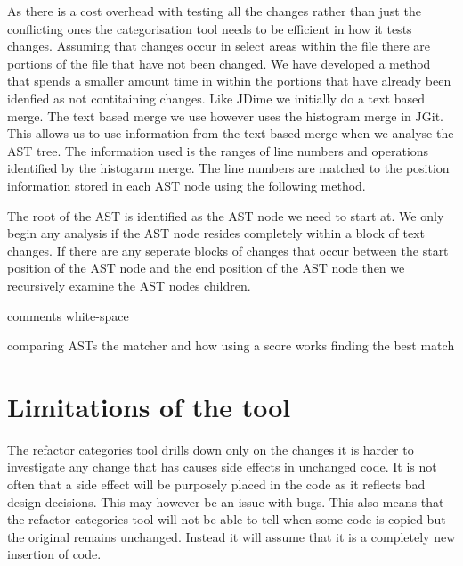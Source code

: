 As there is a cost overhead with testing all the changes rather than just the conflicting ones the categorisation tool needs to be efficient in how it tests changes.  Assuming that changes occur in select areas within the file there are portions of the file that have not been changed.  We have developed a method that spends a smaller amount time in  within the portions that have already been idenfied as not contitaining changes.  Like JDime we initially do a text based merge.  The text based merge we use however uses the histogram merge in JGit.  This allows us to use information from the text based merge when we analyse the AST tree.  The information used is the ranges of line numbers and operations identified by the histogarm merge.  The line numbers are matched to the position information stored in each AST node using the following method.

The root of the AST is identified as the AST node we need to start at. 
We only begin any analysis if the AST node resides completely within a block of text changes.
If there are any seperate blocks of changes that occur between the start position of the AST node and the end position of the AST node then we recursively examine the AST nodes children.


comments
white-space

comparing ASTs
the matcher and how using a score works
finding the best match


% 

\section{Limitations of the tool}
The refactor categories tool drills down only on the changes it is harder to investigate any change that has causes side effects in unchanged code.  It is not often that a side effect will be purposely placed in the code as it reflects bad design decisions.  This may however be an issue with bugs.  This also means that the refactor categories tool will not be able to tell when some code is copied but the original remains unchanged. Instead it will assume that it is a completely new insertion of code.
